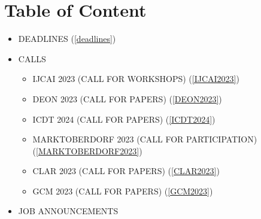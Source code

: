 \documentclass[prodmode,acmtecs]{acmsmall} %
\begin{document}
\section{Table of Content}\begin{itemize}\item DEADLINES (\cref{deadlines}) 
 
\item CALLS 
 
\begin{itemize}\item IJCAI 2023 (CALL FOR WORKSHOPS) (\cref{IJCAI2023})
\item DEON 2023 (CALL FOR PAPERS) (\cref{DEON2023})
\item ICDT 2024 (CALL FOR PAPERS) (\cref{ICDT2024})
\item MARKTOBERDORF 2023 (CALL FOR PARTICIPATION) (\cref{MARKTOBERDORF2023})
\item CLAR 2023 (CALL FOR PAPERS) (\cref{CLAR2023})
\item GCM 2023 (CALL FOR PAPERS) (\cref{GCM2023})
\end{itemize} 
\item JOB ANNOUNCEMENTS 
 

\end{itemize}
\end{document}
